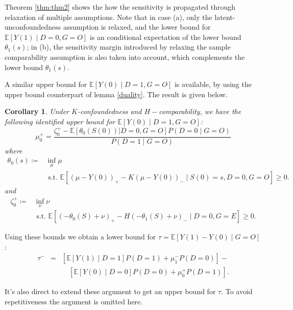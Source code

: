 \documentclass[12pt]{article}
\newtheorem{cor}{Corollary}
\newcommand{\Ep}{\mathbb{E}}
\begin{document}
	Theorem \ref{thm:thm2} shows the how the sensitivity is propagated through relaxation of multiple assumptions. Note that in case (a), only the latent-unconfoundedness assumption is relaxed, and the lower bound for $\Ep[Y(1) \mid D = 0, G =O]$ is an conditional expectation of the lower bound $\theta_1(s)$; in (b), the sensitivity margin introduced by relaxing the sample comparability assumption is also taken into account, which complements the lower bound $\theta_1(s)$. 
	
	A similar upper bound for $\Ep[Y(0) \mid D = 1, G= O]$ is available, by using the upper bound counterpart of lemma \ref{duality}. The result is given below.
	\begin{cor}
			Under $K$-confoundedness and $H-$comparability, we have the following identified upper bound for $\Ep[Y(0) \mid D = 1, G= O]$:
			$$
			\mu^+_0 =\frac{\zeta_0^+ - \Ep[\theta_0(S(0)) | D = 0, G = O] P(D = 0 \mid G = O)}{P(D = 1 \mid G = O)}
			$$
			where 
			\begin{equation}\label{eq:eq5}
			\begin{array}{ll}
			\theta_0(s) \coloneqq & \inf _{\mu}  \mu \\
			& \text { s.t. }  \mathbb{E}\left[(\mu - Y(0))_+ - K (\mu - Y(0))_- \mid S(0) = s, D = 0, G = O \right] \geq 0.
			\end{array}
			\end{equation}
			and
			\begin{equation}\label{eq:eq6}
			\begin{array}{ll}
			\zeta_0^+ \coloneqq & \inf _{\nu}  \nu \\
			& \text { s.t. }  \mathbb{E}\left[(-\theta_0(S)+\nu)_{+}-H(-\theta_1(S)+\nu)_{-} \mid D=0, G = E\right] \geq 0.
			\end{array}
			\end{equation}
	\end{cor}
	
	Using these bounds we obtain a lower bound for $\tau = \Ep[Y(1) - Y(0) \mid G = O]$:
	\begin{eqnarray*}
		\tau^-  & = & \left[\Ep[Y(1) \mid D = 1]P(D = 1) + \mu_1^-  P(D = 0)\right] - \\
		 & & \quad \left[\Ep[Y(0) \mid D = 0]P(D = 0) + \mu_0^+ P(D = 1)\right].
	\end{eqnarray*}
	
	It's also direct to extend these argument to get an upper bound for $\tau$. To avoid repetitiveness the argument is omitted here.
	
\end{document}
